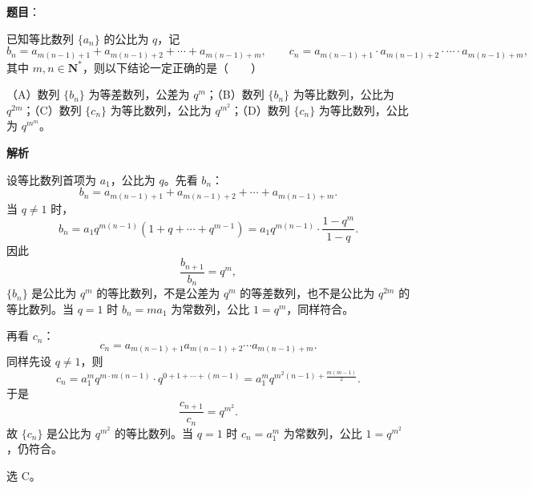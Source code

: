 \begin{answer}

\textbf{题目}：

已知等比数列 $\{a_n\}$ 的公比为 $q$，记
\nopagebreak[4]
\[b_n=a_{m(n-1)+1}+a_{m(n-1)+2}+\cdots+a_{m(n-1)+m},\qquad c_n=a_{m(n-1)+1}\cdot a_{m(n-1)+2}\cdot\cdots\cdot a_{m(n-1)+m},\]
其中 $m,n\in\mathbf N^*$，则以下结论一定正确的是\mbox{（　　）}

（A）数列 $\{b_n\}$ 为等差数列，公差为 $q^m$；（B）数列 $\{b_n\}$ 为等比数列，公比为 $q^{2m}$；（C）数列 $\{c_n\}$ 为等比数列，公比为 $q^{m^2}$；（D）数列 $\{c_n\}$ 为等比数列，公比为 $q^{m^m}$。

\textbf{解析}

设等比数列首项为 $a_1$，公比为 $q$。先看 $b_n$：
\nopagebreak[4]
\[b_n=a_{m(n-1)+1}+a_{m(n-1)+2}+\cdots+a_{m(n-1)+m}.\]
当 $q\neq1$ 时，
\nopagebreak[4]
\[b_n=a_1q^{m(n-1)}\left(1+q+\cdots+q^{m-1}\right)
=a_1q^{m(n-1)}\cdot\frac{1-q^m}{1-q}.\]
因此
\nopagebreak[4]
\[\frac{b_{n+1}}{b_n}=q^m,\]
$\{b_n\}$ 是公比为 $q^m$ 的等比数列，不是公差为 $q^m$ 的等差数列，也不是公比为 $q^{2m}$ 的等比数列。当 $q=1$ 时 $b_n=ma_1$ 为常数列，公比 $1=q^m$，同样符合。

再看 $c_n$：
\nopagebreak[4]
\[c_n=a_{m(n-1)+1}a_{m(n-1)+2}\cdots a_{m(n-1)+m}.\]
同样先设 $q\neq1$，则
\nopagebreak[4]
\[c_n=a_1^m q^{m\cdot m(n-1)}\cdot q^{0+1+\cdots+(m-1)}
=a_1^m q^{m^2(n-1)+\frac{m(m-1)}2}.\]
于是
\nopagebreak[4]
\[\frac{c_{n+1}}{c_n}=q^{m^2}.\]
故 $\{c_n\}$ 是公比为 $q^{m^2}$ 的等比数列。当 $q=1$ 时 $c_n=a_1^m$ 为常数列，公比 $1=q^{m^2}$，仍符合。

选 C。


\end{answer}

